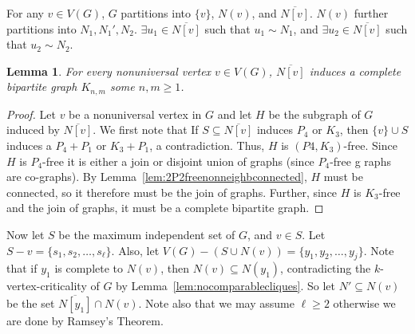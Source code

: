 \documentclass[11pt]{article}
\newtheorem{lemma}[theorem]{Lemma}
\theoremstyle{definition}
\newcommand{\noneighbs}{\overline{N[v]}}
\begin{document}
For any $v\in V(G)$, $G$ partitions into $\{v\}$, $N(v)$, and $\overline{N[v]}$. $N(v)$ further partitions into $N_1, N_1', N_2$. $\exists u_1 \in \noneighbs$ such that $u_1 \sim N_1$, and $\exists u_2 \in \noneighbs$ such that $u_2 \sim N_2$.

\begin{lemma}\label{lem:completebipartite}
For every nonuniversal vertex $v\in V(G)$,  $\noneighbs$ induces a complete bipartite graph $K_{n,m}$ some $n,m\ge 1$.
\end{lemma}
\begin{proof}
Let $v$ be a nonuniversal vertex in $G$ and let $H$ be the subgraph of $G$ induced by $\noneighbs$. We first note that If $S\subseteq\noneighbs$ induces $P_4$ or $K_3$, then $\{v\}\cup S$ induces a $P_4+P_1$ or $K_3+P_1$, a contradiction. Thus, $H$ is $(P4, K_3)$-free. Since $H$ is $P_4$-free it is either a join or disjoint union of graphs (since $P_4$-free g raphs are co-graphs). By Lemma~\ref{lem:2P2freenonneighbconnected}, $H$ must be connected, so it therefore must be the join of graphs. Further, since $H$ is $K_3$-free and the join of graphs, it must be a complete bipartite graph. 
\end{proof}


Now let $S$ be the maximum independent set of $G$, and $v \in S$. Let $S - v = \{s_1, s_2, \dots, s_{\ell}\}$. Also, let $V(G) - (S \cup N(v)) = \{y_1, y_2, \dots, y_j\}$. Note that if $y_1$ is complete to $N(v)$, then $N(v)\subseteq N(y_1)$, contradicting the $k$-vertex-criticality of $G$ by Lemma~\ref{lem:nocomparablecliques}. So let $N' \subseteq N(v)$ be the set $\overline{N[y_1]}\cap N(v)$. Note also that we may assume $\ell\ge 2$ otherwise we are done by Ramsey's Theorem. 
\end{document}
